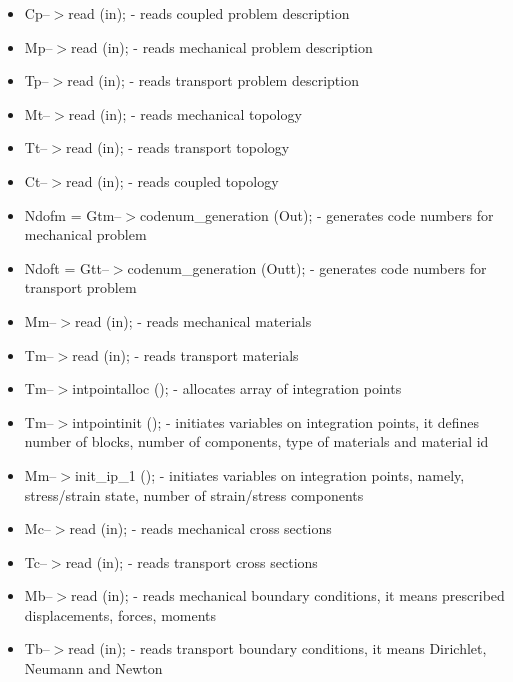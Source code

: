 \begin{itemize}
\item
Cp--$>$read (in); - reads coupled problem description

\item
Mp--$>$read (in); - reads mechanical problem description

\item
Tp--$>$read (in); -  reads transport problem description


\item
Mt--$>$read (in); - reads mechanical topology
\item
Tt--$>$read (in); -  reads transport topology
\item
Ct--$>$read (in); -  reads coupled topology


\item
Ndofm = Gtm--$>$codenum\_generation (Out); - generates code numbers for mechanical problem

\item
Ndoft = Gtt--$>$codenum\_generation (Outt); - generates code numbers for transport problem

\item
Mm--$>$read (in); - reads mechanical materials

\item
Tm--$>$read (in); - reads transport materials

\item
Tm--$>$intpointalloc (); - allocates array of integration points

\item
Tm--$>$intpointinit (); - initiates variables on integration points,
it defines number of blocks, number of components, type of materials and material id

\item
Mm--$>$init\_ip\_1 (); - initiates variables on integration points, namely, stress/strain state,
number of strain/stress components

\item
Mc--$>$read (in); - reads mechanical cross sections

\item
Tc--$>$read (in); - reads transport cross sections

\item
Mb--$>$read (in); - reads mechanical boundary conditions, it means
prescribed displacements, forces, moments

\item
Tb--$>$read (in); - reads transport boundary conditions, it means
Dirichlet, Neumann and Newton


\end{itemize}
